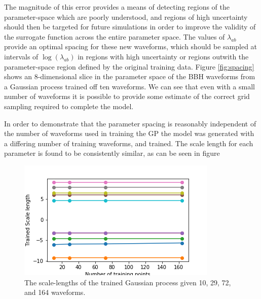 \documentclass[a4paper]{article}
\newcommand{\note}[1]{{\bf #1}}
\begin{document}
The magnitude of this error provides a means of detecting regions of
the parameter-space which are poorly understood, and regions of high
uncertainty should then be targeted for future simulations in order to
improve the validity of the surrogate function across the entire
parameter space. The values of $\lambda_{ab}$ provide an optimal
spacing for these new waveforms, which should be sampled at intervals
of $\log(\lambda_{ab})$ in regions with high uncertainty or regions
outwith the parameter-space region defined by the original training
data. Figure \ref{fig:spacing} shows an 8-dimensional slice in the
parameter space of the BBH waveforms from a Gaussian process trained
off ten waveforms. We can see that even with a small number of
waveforms it is possible to provide some estimate of the correct grid
sampling required to complete the model.

In order to demonstrate that the parameter spacing is reasonably
independent of the number of waveforms used in training the GP the
model was generated with a differing number of training waveforms, and
trained. The scale length for each parameter is found to be
consistently similar, as can be seen in figure

\begin{figure}
  \centering
  \includegraphics{convergence.png}
  \caption{The scale-lengths of the trained Gaussian process given 10, 29, 72, and 164 waveforms.}
  \label{fig:convergence}
\end{figure}

\end{document}
